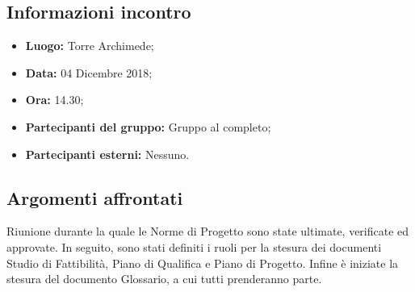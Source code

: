 \subsection{Informazioni incontro}
\begin{itemize}
	\item { \textbf{Luogo:} Torre Archimede;  }
	\item { \textbf{Data:} 04 Dicembre 2018; }
	\item { \textbf{Ora:} 14.30; }
	\item { \textbf{Partecipanti del gruppo:} Gruppo al completo; }
	\item { \textbf{Partecipanti esterni:} Nessuno. }
\end{itemize}


\subsection{Argomenti affrontati}
Riunione durante la quale le Norme di Progetto sono state ultimate, verificate ed approvate. In seguito, sono stati definiti i ruoli per la stesura dei documenti Studio di Fattibilità, Piano di Qualifica e Piano di Progetto. Infine è iniziate la stesura del documento Glossario, a cui tutti prenderanno parte.

